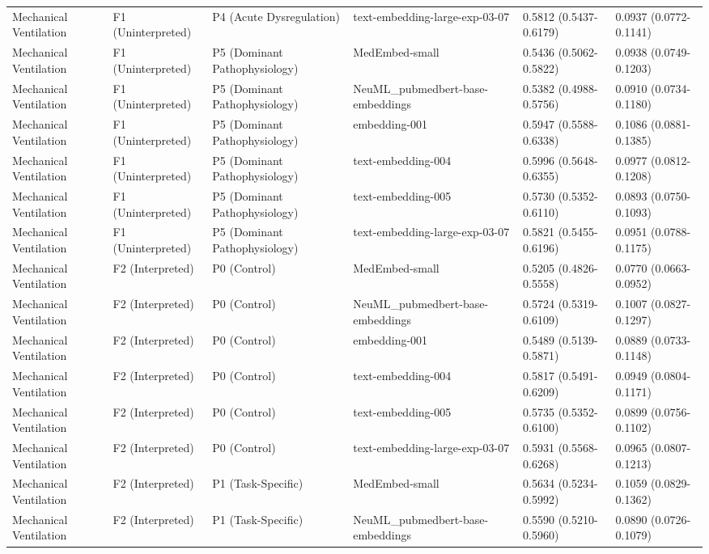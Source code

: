 \documentclass[border=0pt]{standalone}
\begin{document}
\begin{adjustbox}{width=\textwidth}
\begin{tabular}{llllll}
Mechanical Ventilation & F1 (Uninterpreted) & P4 (Acute Dysregulation) & text-embedding-large-exp-03-07 & 0.5812 (0.5437-0.6179) & 0.0937 (0.0772-0.1141) \\
Mechanical Ventilation & F1 (Uninterpreted) & P5 (Dominant Pathophysiology) & MedEmbed-small & 0.5436 (0.5062-0.5822) & 0.0938 (0.0749-0.1203) \\
Mechanical Ventilation & F1 (Uninterpreted) & P5 (Dominant Pathophysiology) & NeuML\_pubmedbert-base-embeddings & 0.5382 (0.4988-0.5756) & 0.0910 (0.0734-0.1180) \\
Mechanical Ventilation & F1 (Uninterpreted) & P5 (Dominant Pathophysiology) & embedding-001 & 0.5947 (0.5588-0.6338) & 0.1086 (0.0881-0.1385) \\
Mechanical Ventilation & F1 (Uninterpreted) & P5 (Dominant Pathophysiology) & text-embedding-004 & 0.5996 (0.5648-0.6355) & 0.0977 (0.0812-0.1208) \\
Mechanical Ventilation & F1 (Uninterpreted) & P5 (Dominant Pathophysiology) & text-embedding-005 & 0.5730 (0.5352-0.6110) & 0.0893 (0.0750-0.1093) \\
Mechanical Ventilation & F1 (Uninterpreted) & P5 (Dominant Pathophysiology) & text-embedding-large-exp-03-07 & 0.5821 (0.5455-0.6196) & 0.0951 (0.0788-0.1175) \\
Mechanical Ventilation & F2 (Interpreted) & P0 (Control) & MedEmbed-small & 0.5205 (0.4826-0.5558) & 0.0770 (0.0663-0.0952) \\
Mechanical Ventilation & F2 (Interpreted) & P0 (Control) & NeuML\_pubmedbert-base-embeddings & 0.5724 (0.5319-0.6109) & 0.1007 (0.0827-0.1297) \\
Mechanical Ventilation & F2 (Interpreted) & P0 (Control) & embedding-001 & 0.5489 (0.5139-0.5871) & 0.0889 (0.0733-0.1148) \\
Mechanical Ventilation & F2 (Interpreted) & P0 (Control) & text-embedding-004 & 0.5817 (0.5491-0.6209) & 0.0949 (0.0804-0.1171) \\
Mechanical Ventilation & F2 (Interpreted) & P0 (Control) & text-embedding-005 & 0.5735 (0.5352-0.6100) & 0.0899 (0.0756-0.1102) \\
Mechanical Ventilation & F2 (Interpreted) & P0 (Control) & text-embedding-large-exp-03-07 & 0.5931 (0.5568-0.6268) & 0.0965 (0.0807-0.1213) \\
Mechanical Ventilation & F2 (Interpreted) & P1 (Task-Specific) & MedEmbed-small & 0.5634 (0.5234-0.5992) & 0.1059 (0.0829-0.1362) \\
Mechanical Ventilation & F2 (Interpreted) & P1 (Task-Specific) & NeuML\_pubmedbert-base-embeddings & 0.5590 (0.5210-0.5960) & 0.0890 (0.0726-0.1079) \\

\end{tabular}
\end{adjustbox}
\end{document}
